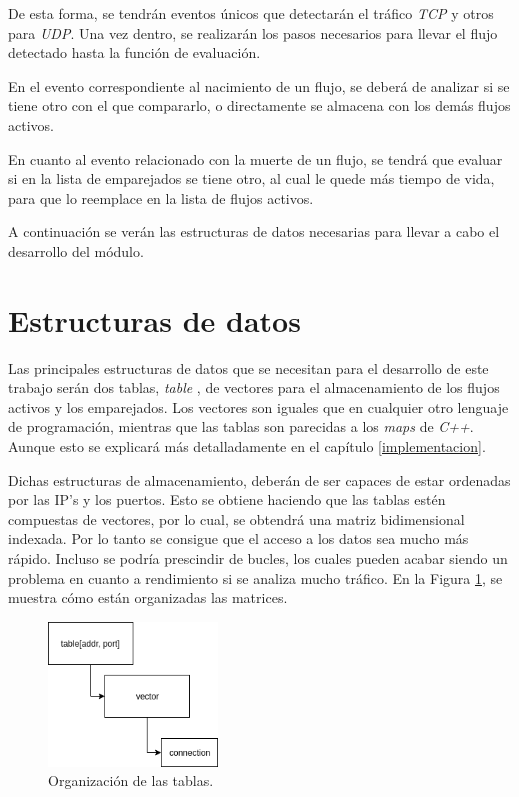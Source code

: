 \intro De esta forma, se tendrán eventos únicos que detectarán el tráfico \textit{TCP} y otros para \textit{UDP}. Una vez dentro, se 
realizarán los pasos necesarios para llevar el flujo detectado hasta la función de evaluación.

\intro En el evento correspondiente al nacimiento de un flujo, se deberá de analizar si se tiene otro con el que compararlo, o directamente se almacena con los demás flujos activos.

\intro En cuanto al evento relacionado con la muerte de un flujo, se tendrá que evaluar si en la lista de emparejados se tiene otro, al cual le quede más tiempo de vida, para que lo reemplace en la lista de flujos activos.

\intro A continuación se verán las estructuras de datos necesarias para llevar a cabo el desarrollo del módulo.

\section{Estructuras de datos}

Las principales estructuras de datos que se necesitan para el desarrollo de este trabajo serán dos tablas, \textit{table} 
\cite{brotable}, de vectores para el almacenamiento de los flujos activos y los emparejados. Los vectores son iguales que en cualquier 
otro lenguaje de programación, mientras que las tablas son parecidas a los \textit{maps} de \textit{C++}. Aunque esto se explicará más 
detalladamente en el capítulo \ref{implementacion}.

\intro Dichas estructuras de almacenamiento, deberán de ser capaces de estar ordenadas por las IP's y los puertos. Esto se obtiene 
haciendo que las tablas estén compuestas de vectores, por lo cual, se obtendrá una matriz bidimensional indexada. Por lo tanto se 
consigue que el acceso a los datos sea mucho más rápido. Incluso se podría prescindir de bucles, los cuales pueden acabar 
siendo un problema en cuanto a rendimiento si se analiza mucho tráfico. En la Figura \ref{fig.tablas}, se muestra cómo están 
organizadas las matrices.

\begin{figure}[H]
  \includegraphics[width=0.4\textwidth]{imagenes/tablas.png}
  \centering
  \caption{Organización de las tablas.}\label{fig.tablas}
\end{figure}

